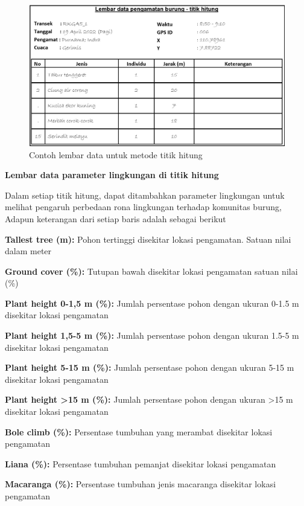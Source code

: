 \documentclass[
]{book}
\begin{document}
\begin{figure}

{\centering \includegraphics[width=1\linewidth]{images/ldp_th} 

}

\caption{Contoh lembar data untuk metode titik hitung}\label{fig:ldpth}
\end{figure}

\textbf{Lembar data parameter lingkungan di titik hitung}

Dalam setiap titik hitung, dapat ditambahkan parameter lingkungan untuk melihat pengaruh perbedaan rona lingkungan terhadap komunitas burung, Adapun keterangan dari setiap baris adalah sebagai berikut

\textbf{Tallest tree (m):} Pohon tertinggi disekitar lokasi pengamatan. Satuan nilai dalam meter

\textbf{Ground cover (\%):} Tutupan bawah disekitar lokasi pengamatan satuan nilai (\%)

\textbf{Plant height 0-1,5 m (\%):} Jumlah persentase pohon dengan ukuran 0-1.5 m disekitar lokasi pengamatan

\textbf{Plant height 1,5-5 m (\%):} Jumlah persentase pohon dengan ukuran 1.5-5 m disekitar lokasi pengamatan

\textbf{Plant height 5-15 m (\%):} Jumlah persentase pohon dengan ukuran 5-15 m disekitar lokasi pengamatan

\textbf{Plant height \textgreater15 m (\%):} Jumlah persentase pohon dengan ukuran \textgreater15 m disekitar lokasi pengamatan

\textbf{Bole climb (\%):} Persentase tumbuhan yang merambat disekitar lokasi pengamatan

\textbf{Liana (\%):} Persentase tumbuhan pemanjat disekitar lokasi pengamatan

\textbf{Macaranga (\%):} Persentase tumbuhan jenis macaranga disekitar lokasi pengamatan
\end{document}
